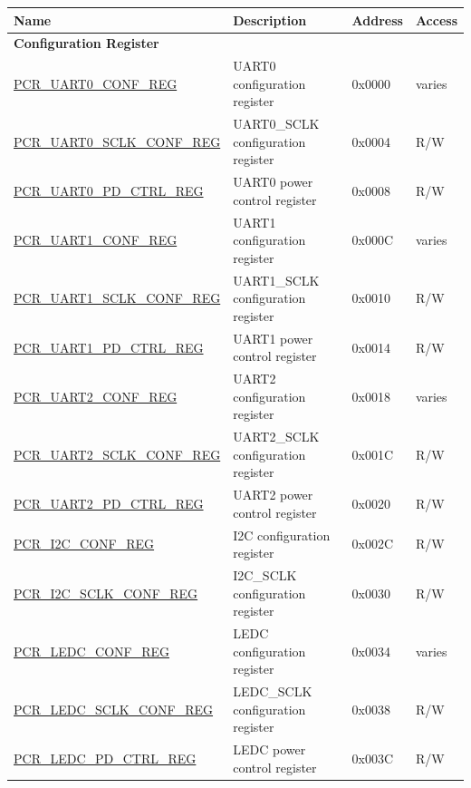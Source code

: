 \begin{longtable}{ | p{7cm} | p{6.2cm} | p{1.3cm} | p{1cm} | }
\hline\rowcolor{lightgray}
\textbf{Name} & \textbf{Description} &  \textbf{Address} & \textbf{Access} \\ \hline
\endhead
\multicolumn{4}{|l|}{\textbf{Configuration Register}} \\ \hline
\hyperref[regdesc:PCRUART0CONFREG]{PCR\_UART0\_CONF\_REG} & UART0 configuration register & 0x0000 & varies \\ \hline
\hyperref[regdesc:PCRUART0SCLKCONFREG]{PCR\_UART0\_SCLK\_CONF\_REG} & UART0\_SCLK configuration register & 0x0004 & R/W \\ \hline
\hyperref[regdesc:PCRUART0PDCTRLREG]{PCR\_UART0\_PD\_CTRL\_REG} & UART0 power control register & 0x0008 & R/W \\ \hline
\hyperref[regdesc:PCRUART1CONFREG]{PCR\_UART1\_CONF\_REG} & UART1 configuration register & 0x000C & varies \\ \hline
\hyperref[regdesc:PCRUART1SCLKCONFREG]{PCR\_UART1\_SCLK\_CONF\_REG} & UART1\_SCLK configuration register & 0x0010 & R/W \\ \hline
\hyperref[regdesc:PCRUART1PDCTRLREG]{PCR\_UART1\_PD\_CTRL\_REG} & UART1 power control register & 0x0014 & R/W \\ \hline
\hyperref[regdesc:PCRUART2CONFREG]{PCR\_UART2\_CONF\_REG} & UART2 configuration register & 0x0018 & varies \\ \hline
\hyperref[regdesc:PCRUART2SCLKCONFREG]{PCR\_UART2\_SCLK\_CONF\_REG} & UART2\_SCLK configuration register & 0x001C & R/W \\ \hline
\hyperref[regdesc:PCRUART2PDCTRLREG]{PCR\_UART2\_PD\_CTRL\_REG} & UART2 power control register & 0x0020 & R/W \\ \hline
\hyperref[regdesc:PCRI2CCONFREG]{PCR\_I2C\_CONF\_REG} & I2C configuration register & 0x002C & R/W \\ \hline
\hyperref[regdesc:PCRI2CSCLKCONFREG]{PCR\_I2C\_SCLK\_CONF\_REG} & I2C\_SCLK configuration register & 0x0030 & R/W \\ \hline
\hyperref[regdesc:PCRLEDCCONFREG]{PCR\_LEDC\_CONF\_REG} & LEDC configuration register & 0x0034 & varies \\ \hline
\hyperref[regdesc:PCRLEDCSCLKCONFREG]{PCR\_LEDC\_SCLK\_CONF\_REG} & LEDC\_SCLK configuration register & 0x0038 & R/W \\ \hline
\hyperref[regdesc:PCRLEDCPDCTRLREG]{PCR\_LEDC\_PD\_CTRL\_REG} & LEDC power control register & 0x003C & R/W \\ \hline

\end{longtable}
